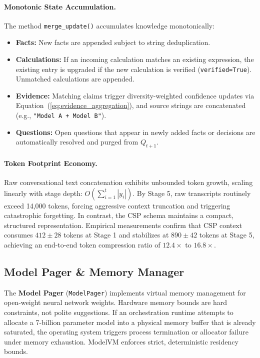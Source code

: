 \paragraph{Monotonic State Accumulation.}
The method \texttt{merge\_update()} accumulates knowledge monotonically:
\begin{itemize}
    \item \textbf{Facts:} New facts are appended subject to string deduplication.
    \item \textbf{Calculations:} If an incoming calculation matches an existing expression, the existing entry is upgraded if the new calculation is verified (\texttt{verified=True}). Unmatched calculations are appended.
    \item \textbf{Evidence:} Matching claims trigger diversity-weighted confidence updates via Equation~(\ref{eq:evidence_aggregation}), and source strings are concatenated (e.g., \texttt{"Model A + Model B"}).
    \item \textbf{Questions:} Open questions that appear in newly added facts or decisions are automatically resolved and purged from $Q_{t+1}$.
\end{itemize}

\paragraph{Token Footprint Economy.}
Raw conversational text concatenation exhibits unbounded token growth, scaling linearly with stage depth: $O(\sum_{i=1}^t |y_i|)$. By Stage 5, raw transcripts routinely exceed 14,000 tokens, forcing aggressive context truncation and triggering catastrophic forgetting. In contrast, the CSP schema maintains a compact, structured representation. Empirical measurements confirm that CSP context consumes $412 \pm 28$ tokens at Stage 1 and stabilizes at $890 \pm 42$ tokens at Stage 5, achieving an end-to-end token compression ratio of $12.4\times$ to $16.8\times$.

\subsection{Model Pager \& Memory Manager}
\label{sec:pager_mechanics}

The \textbf{Model Pager} (\texttt{ModelPager}) implements virtual memory management for open-weight neural network weights. Hardware memory bounds are hard constraints, not polite suggestions. If an orchestration runtime attempts to allocate a 7-billion parameter model into a physical memory buffer that is already saturated, the operating system triggers process termination or allocator failure under memory exhaustion. ModelVM enforces strict, deterministic residency bounds.

